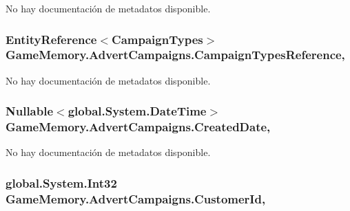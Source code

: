 No hay documentación de metadatos disponible. 

\hypertarget{class_game_memory_1_1_advert_campaigns_ade5c3b4524c9c97b3ecd4e584839217c}{
\subsubsection[{Campaign\-Types\-Reference}]{\setlength{\rightskip}{0pt plus 5cm}Entity\-Reference$<${\bf Campaign\-Types}$>$ Game\-Memory.\-Advert\-Campaigns.\-Campaign\-Types\-Reference\hspace{0.3cm}{\ttfamily [get]}, {\ttfamily [set]}}}\label{class_game_memory_1_1_advert_campaigns_ade5c3b4524c9c97b3ecd4e584839217c}


No hay documentación de metadatos disponible. 

\hypertarget{class_game_memory_1_1_advert_campaigns_a2a4e8304035a50ff877a6486d60a9e3e}{
\subsubsection[{Created\-Date}]{\setlength{\rightskip}{0pt plus 5cm}Nullable$<$global.\-System.\-Date\-Time$>$ Game\-Memory.\-Advert\-Campaigns.\-Created\-Date\hspace{0.3cm}{\ttfamily [get]}, {\ttfamily [set]}}}\label{class_game_memory_1_1_advert_campaigns_a2a4e8304035a50ff877a6486d60a9e3e}


No hay documentación de metadatos disponible. 

\hypertarget{class_game_memory_1_1_advert_campaigns_a3bbff19846dd4093f2e35a474d46052f}{
\subsubsection[{Customer\-Id}]{\setlength{\rightskip}{0pt plus 5cm}global.\-System.\-Int32 Game\-Memory.\-Advert\-Campaigns.\-Customer\-Id\hspace{0.3cm}{\ttfamily [get]}, {\ttfamily [set]}}}\label{class_game_memory_1_1_advert_campaigns_a3bbff19846dd4093f2e35a474d46052f}


